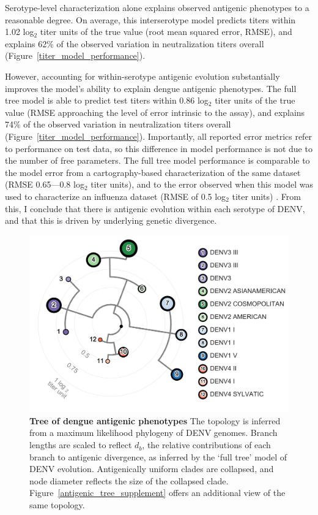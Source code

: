 Serotype-level characterization alone explains observed antigenic phenotypes to a reasonable degree.
On average, this interserotype model predicts titers within 1.02 log$_2$ titer units of the true value (root mean squared error, RMSE), and explains 62\% of the observed variation in neutralization titers overall (Figure~\ref{titer_model_performance}).

However, accounting for within-serotype antigenic evolution substantially improves the model's ability to explain dengue antigenic phenotypes.
The full tree model is able to predict test titers within 0.86 log$_2$ titer units of the true value (RMSE approaching the level of error intrinsic to the assay), and explains 74\% of the observed variation in neutralization titers overall (Figure~\ref{titer_model_performance}).
Importantly, all reported error metrics refer to performance on test data, so this difference in model performance is not due to the number of free parameters.
The full tree model performance is comparable to the model error from a cartography-based characterization of the same dataset (RMSE 0.65---0.8 log$_2$ titer units), and to the error observed when this model was used to characterize an influenza dataset (RMSE of 0.5 log$_2$ titer units) \citep{katzelnick2015dengue,neher2016prediction}.
From this, I conclude that there is antigenic evolution within each serotype of DENV, and that this is driven by underlying genetic divergence.

\begin{figure}[ht!]
  \begin{centering}
    \includegraphics[width=.8\linewidth]{./png/antigenic_tree.png}
    \caption[Tree of dengue antigenic phenotypes]{\textbf{Tree of dengue antigenic phenotypes }
    The topology is inferred from a maximum likelihood phylogeny of DENV genomes.
    Branch lengths are scaled to reflect $d_b$, the relative contributions of each branch to antigenic divergence, as inferred by the `full tree' model of DENV evolution.
    Antigenically uniform clades are collapsed, and node diameter reflects the size of the collapsed clade.
    Figure~\ref{antigenic_tree_supplement} offers an additional view of the same topology.
    }
     \label{antigenic_tree}
  \end{centering}
\end{figure}

